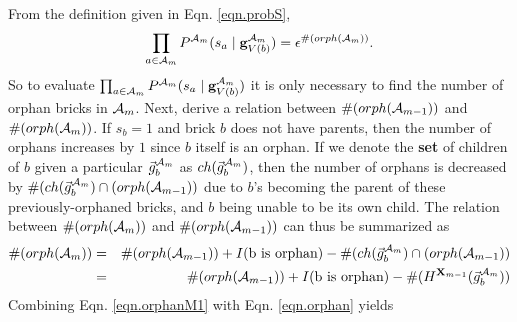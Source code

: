 \documentclass[11pt]{article}
\newcommand{\A}{{\cal A}}
\newcommand{\X}{\mathbf{X}}
\newcommand{\Am}{\A_{m}}
\begin{document}
From the definition given in Eqn. \ref{eqn.probS}, 
%
\begin{eqnarray}
\prod_{a \in {\Am}} P^{\Am}(s_a \mid \mathbf{g}^{\Am}_{V({b})}) = \epsilon^{\#(orph(\Am))}. \label{eqn.orphan}
\end{eqnarray}
%
So to evaluate $\prod_{a \in {\Am}} P^{\Am}(s_a \mid \mathbf{g}^{\Am}_{V({b})})$ it is only necessary to find the number of orphan bricks in $\Am$.
%
Next, derive a relation between $\#(orph(\A_{m-1}))$ and $\#(orph(\A_{m}))$. If $s_b=1$ and brick $b$ does not have parents, then the number of orphans increases by $1$ since $b$ itself is an orphan. If we denote the \textbf{set} of children of $b$ given a particular $\vec{g}_b^{\Am}$ as $ch(\vec{g}_b^{\Am})$, then the number of orphans is decreased by $\#(ch(\vec{g}_b^{\Am}) \cap (orph(\A_{m-1}))$ due to $b$'s becoming the parent of these previously-orphaned bricks, and $b$ being unable to be its own child. The relation between $\#(orph(\A_{m}))$ and $\#(orph(\A_{m-1}))$ can thus be summarized as
%
\begin{eqnarray}
\#(orph(\Am)) &=& \#(orph(\A_{m-1})) + I(\text{b is orphan}) - \#(ch(\vec{g}_b^{\Am}) \cap (orph(\A_{m-1})) \\
%
&=& \#(orph(\A_{m-1})) + I(\text{b is orphan}) - \#(H^{\X_{m-1}}(\vec{g}_b^{\Am})) \label{eqn.orphanM1}
\end{eqnarray}
%
Combining Eqn. \ref{eqn.orphanM1} with Eqn. \ref{eqn.orphan} yields
\end{document}
